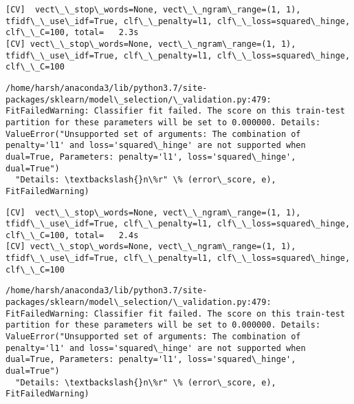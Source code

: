 \documentclass[11pt]{article}
\begin{document}
    \begin{Verbatim}[commandchars=\\\{\}]
[CV]  vect\_\_stop\_words=None, vect\_\_ngram\_range=(1, 1), tfidf\_\_use\_idf=True, clf\_\_penalty=l1, clf\_\_loss=squared\_hinge, clf\_\_C=100, total=   2.3s
[CV] vect\_\_stop\_words=None, vect\_\_ngram\_range=(1, 1), tfidf\_\_use\_idf=True, clf\_\_penalty=l1, clf\_\_loss=squared\_hinge, clf\_\_C=100 

    \end{Verbatim}

    \begin{Verbatim}[commandchars=\\\{\}]
/home/harsh/anaconda3/lib/python3.7/site-packages/sklearn/model\_selection/\_validation.py:479: FitFailedWarning: Classifier fit failed. The score on this train-test partition for these parameters will be set to 0.000000. Details: 
ValueError("Unsupported set of arguments: The combination of penalty='l1' and loss='squared\_hinge' are not supported when dual=True, Parameters: penalty='l1', loss='squared\_hinge', dual=True")
  "Details: \textbackslash{}n\%r" \% (error\_score, e), FitFailedWarning)

    \end{Verbatim}

    \begin{Verbatim}[commandchars=\\\{\}]
[CV]  vect\_\_stop\_words=None, vect\_\_ngram\_range=(1, 1), tfidf\_\_use\_idf=True, clf\_\_penalty=l1, clf\_\_loss=squared\_hinge, clf\_\_C=100, total=   2.4s
[CV] vect\_\_stop\_words=None, vect\_\_ngram\_range=(1, 1), tfidf\_\_use\_idf=True, clf\_\_penalty=l1, clf\_\_loss=squared\_hinge, clf\_\_C=100 

    \end{Verbatim}

    \begin{Verbatim}[commandchars=\\\{\}]
/home/harsh/anaconda3/lib/python3.7/site-packages/sklearn/model\_selection/\_validation.py:479: FitFailedWarning: Classifier fit failed. The score on this train-test partition for these parameters will be set to 0.000000. Details: 
ValueError("Unsupported set of arguments: The combination of penalty='l1' and loss='squared\_hinge' are not supported when dual=True, Parameters: penalty='l1', loss='squared\_hinge', dual=True")
  "Details: \textbackslash{}n\%r" \% (error\_score, e), FitFailedWarning)

    \end{Verbatim}
\end{document}
